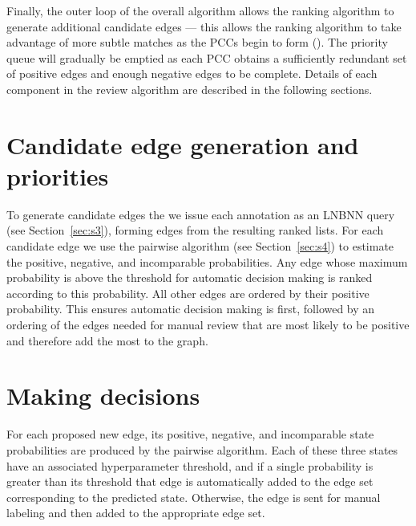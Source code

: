 Finally, the outer loop of the overall algorithm allows the ranking algorithm
  to generate additional candidate edges --- this allows the ranking algorithm
  to take advantage of more subtle matches as the PCCs begin to form
  ().
The priority queue will gradually be emptied as each PCC obtains a
  sufficiently redundant set of positive edges and enough negative edges to be
  complete.
Details of each component in the review algorithm are described in the
  following sections.




\section{Candidate edge generation and priorities}\label{sec:cand}
To generate candidate edges the we issue each annotation as an LNBNN query
  (see Section~\ref{sec:s3}), forming edges from the resulting ranked lists.
For each candidate edge we use the pairwise algorithm (see
  Section~\ref{sec:s4}) to estimate the positive, negative, and incomparable
  probabilities.
Any edge whose maximum probability is above the threshold for automatic
  decision making is ranked according to this probability.
All other edges are ordered by their positive probability.
This ensures automatic decision making is first, followed by an ordering of
  the edges needed for manual review that are most likely to be positive and
  therefore add the most to the graph.

\section{Making decisions}\label{sec:decision}


For each proposed new edge, its positive, negative, and incomparable state
  probabilities are produced by the pairwise algorithm.
Each of these three states have an associated hyperparameter threshold, and if
  a single probability is greater than its threshold that edge is automatically
  added to the edge set corresponding to the predicted state.
Otherwise, the edge is sent for manual labeling and then added to the
  appropriate edge set.

